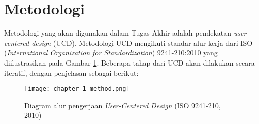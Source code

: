 \section{Metodologi}
\label{sec:metodologi}

Metodologi yang akan digunakan dalam Tugas Akhir adalah pendekatan \textit{user-centered design} (UCD). Metodologi UCD mengikuti standar alur kerja dari ISO (\textit{International Organization for Standardization}) 9241-210:2010 yang diilustrasikan pada Gambar \ref{fig:diagram_iso1}. Beberapa tahap dari UCD akan dilakukan secara iteratif, dengan penjelasan sebagai berikut: 


\begin{figure}[h]
  \centering
  \texttt{[image: chapter-1-method.png]}
  \caption{Diagram alur pengerjaan \textit{User-Centered Design} (ISO 9241-210, 2010)}
  \label{fig:diagram_iso1}
\end{figure}


